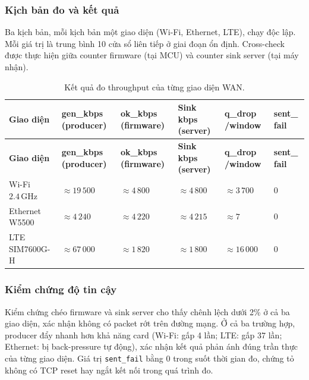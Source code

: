 \subsubsection{Kịch bản đo và kết quả}

Ba kịch bản, mỗi kịch bản một giao diện (Wi-Fi, Ethernet, LTE), chạy độc lập. Mỗi giá trị là trung bình 10 cửa sổ liên tiếp ở giai đoạn ổn định. Cross-check được thực hiện giữa counter firmware (tại MCU) và counter sink server (tại máy nhận).

\begin{longtable}{|p{3.25cm}|p{2.25cm}|p{2.25cm}|p{2.25cm}|p{1.75cm}|p{1.25cm}|}
    \caption{Kết quả đo throughput của từng giao diện WAN.}
    \label{tab:wan_results} \\
    \hline
    \textbf{Giao diện} & \textbf{gen\_kbps (producer)} & \textbf{ok\_kbps (firmware)} & \textbf{Sink kbps (server)} & \textbf{q\_drop /window} & \textbf{sent\_} \newline \textbf{fail} \\ \hline
    \endfirsthead
    \hline
    \textbf{Giao diện} & \textbf{gen\_kbps (producer)} & \textbf{ok\_kbps (firmware)} & \textbf{Sink kbps (server)} & \textbf{q\_drop /window} & \textbf{sent\_} \newline \textbf{fail} \\ \hline
    \endhead
    \hline
    \endfoot
    \endlastfoot
    Wi-Fi $2{.}4\,\text{GHz}$ & $\approx 19\,500$ & $\approx 4\,800$ & $\approx 4\,800$ & $\approx 3\,700$ & 0 \\ \hline
    Ethernet W5500 & $\approx 4\,240$ & $\approx 4\,220$ & $\approx 4\,215$ & $\approx 7$ & 0 \\ \hline
    LTE SIM7600G-H & $\approx 67\,000$ & $\approx 1\,820$ & $\approx 1\,800$ & $\approx 16\,000$ & 0 \\ \hline
\end{longtable}

\subsubsection{Kiểm chứng độ tin cậy}

Kiểm chứng chéo firmware và sink server cho thấy chênh lệch dưới 2\% ở cả ba giao diện, xác nhận không có packet rớt trên đường mạng. Ở cả ba trường hợp, producer đẩy nhanh hơn khả năng card (Wi-Fi: gấp 4 lần; LTE: gấp 37 lần; Ethernet: bị back-pressure tự động), xác nhận kết quả phản ánh đúng trần thực của từng giao diện. Giá trị \texttt{sent\_fail} bằng 0 trong suốt thời gian đo, chứng tỏ không có TCP reset hay ngắt kết nối trong quá trình đo.

